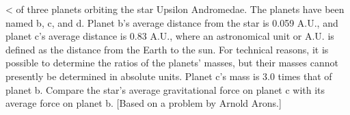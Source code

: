  <%
of three planets orbiting the star Upsilon Andromedae. The
planets have been named b, c, and d. Planet b's
average distance from the star is 0.059 A.U., and planet c's
average distance is 0.83 A.U., where an astronomical unit or
A.U. is defined as the distance from the Earth to the sun.
For technical reasons, it is possible to determine the
ratios of the planets' masses, but their masses cannot
presently be determined in absolute units. Planet c's mass
is 3.0 times that of planet b. Compare the star's average
gravitational force on planet c with its average force on
planet b. [Based on a problem by Arnold Arons.]
